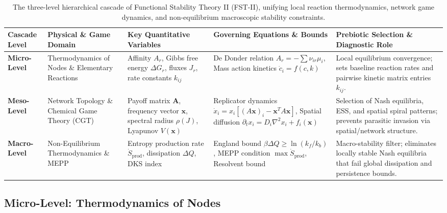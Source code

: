 \documentclass[12pt,a4paper]{article}
\theoremstyle{remark}
\begin{document}
\begin{table}[htbp]
\centering
\caption{The three-level hierarchical cascade of Functional Stability Theory II (FST-II), unifying local reaction thermodynamics, network game dynamics, and non-equilibrium macroscopic stability constraints.}
\label{tab:hierarchical-cascade}
\scriptsize
\setlength{\tabcolsep}{3pt}
\begin{tabularx}{\textwidth}{@{}>{\raggedright\arraybackslash}p{}>{\raggedright\arraybackslash}p{}>{\raggedright\arraybackslash}p{}>{\raggedright\arraybackslash}p{}>{\raggedright\arraybackslash}X@{}}
\toprule
\textbf{Cascade Level} & \textbf{Physical \& Game Domain} & \textbf{Key Quantitative Variables} & \textbf{Governing Equations \& Bounds} & \textbf{Prebiotic Selection \& Diagnostic Role} \\
\midrule
\textbf{Micro-Level} & Thermodynamics of Nodes \& Elementary Reactions & Affinity $A_r$, Gibbs free energy $\Delta G_r$, fluxes $J_r$, rate constants $k_{ij}$ & De Donder relation $A_r = -\sum \nu_{ir}\mu_i$, Mass action kinetics $\dot{c}_i = f(c,k)$ & Local equilibrium convergence; sets baseline reaction rates and pairwise kinetic matrix entries $k_{ij}$. \\
\midrule
\textbf{Meso-Level} & Network Topology \& Chemical Game Theory (CGT) & Payoff matrix $\mathbf{A}$, frequency vector $\mathbf{x}$, spectral radius $\rho(J)$, Lyapunov $V(\mathbf{x})$ & Replicator dynamics $\dot{x}_i = x_i [(A\mathbf{x})_i - \mathbf{x}^T A\mathbf{x}]$, Spatial diffusion $\partial_t x_i = D_i \nabla^2 x_i + f_i(\mathbf{x})$ & Selection of Nash equilibria, ESS, and spatial spiral patterns; prevents parasitic invasion via spatial/network structure. \\
\midrule
\textbf{Macro-Level} & Non-Equilibrium Thermodynamics \& MEPP & Entropy production rate $\dot{S}_{\text{prod}}$, dissipation $\Delta Q$, DKS index & England bound $\beta \Delta Q \ge \ln(k_f/k_b)$, MEPP condition $\max \dot{S}_{\text{prod}}$, Resolvent bound & Macro-stability filter; eliminates locally stable Nash equilibria that fail global dissipation and persistence bounds. \\
\bottomrule
\end{tabularx}
\end{table}

\subsection{Micro-Level: Thermodynamics of Nodes}
\end{document}
